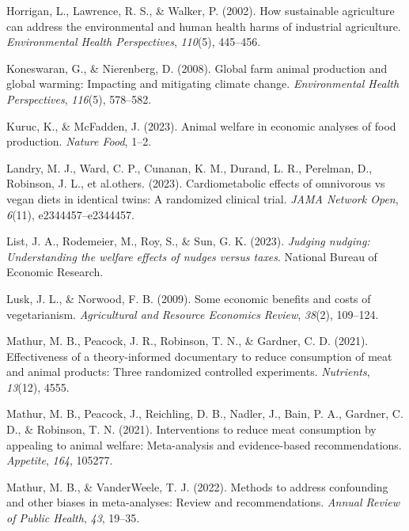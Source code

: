 \documentclass[
  man]{apa6}
\newlength{\cslhangindent}
\newenvironment{CSLReferences}[2] %
 {\begin{list}{}{%
  \setlength{\itemindent}{0pt}
  \setlength{\leftmargin}{0pt}
  \setlength{\parsep}{0pt}
  \ifodd #1
   \setlength{\leftmargin}{\cslhangindent}
   \setlength{\itemindent}{-1\cslhangindent}
  \fi
  \setlength{\itemsep}{#2\baselineskip}}}
 {\end{list}}
\begin{document}
\begin{CSLReferences}{1}{0}
Horrigan, L., Lawrence, R. S., \& Walker, P. (2002). How sustainable agriculture can address the environmental and human health harms of industrial agriculture. \emph{Environmental Health Perspectives}, \emph{110}(5), 445--456.

Koneswaran, G., \& Nierenberg, D. (2008). Global farm animal production and global warming: Impacting and mitigating climate change. \emph{Environmental Health Perspectives}, \emph{116}(5), 578--582.

Kuruc, K., \& McFadden, J. (2023). Animal welfare in economic analyses of food production. \emph{Nature Food}, 1--2.

Landry, M. J., Ward, C. P., Cunanan, K. M., Durand, L. R., Perelman, D., Robinson, J. L., et al.others. (2023). Cardiometabolic effects of omnivorous vs vegan diets in identical twins: A randomized clinical trial. \emph{JAMA Network Open}, \emph{6}(11), e2344457--e2344457.

List, J. A., Rodemeier, M., Roy, S., \& Sun, G. K. (2023). \emph{Judging nudging: Understanding the welfare effects of nudges versus taxes}. National Bureau of Economic Research.

Lusk, J. L., \& Norwood, F. B. (2009). Some economic benefits and costs of vegetarianism. \emph{Agricultural and Resource Economics Review}, \emph{38}(2), 109--124.

Mathur, M. B., Peacock, J. R., Robinson, T. N., \& Gardner, C. D. (2021). Effectiveness of a theory-informed documentary to reduce consumption of meat and animal products: Three randomized controlled experiments. \emph{Nutrients}, \emph{13}(12), 4555.

Mathur, M. B., Peacock, J., Reichling, D. B., Nadler, J., Bain, P. A., Gardner, C. D., \& Robinson, T. N. (2021). Interventions to reduce meat consumption by appealing to animal welfare: Meta-analysis and evidence-based recommendations. \emph{Appetite}, \emph{164}, 105277.

Mathur, M. B., \& VanderWeele, T. J. (2022). Methods to address confounding and other biases in meta-analyses: Review and recommendations. \emph{Annual Review of Public Health}, \emph{43}, 19--35.


\end{CSLReferences}
\end{document}
